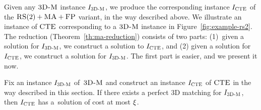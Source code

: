 
 \bigskip
 
 Given any $\textsc{3D-M}$ instance $I_{\mathrm{\textsc{3D-M}}}$, we produce the corresponding instance $I_{\mathrm{\textsc{CTE}}}$ of the $\textsc{RS}(2)+\textsc{MA}+\textsc{FP}$ variant, in the way described above.
 We illustrate an instance of $\textsc{CTE}$ corresponding to a $\textsc{3D-M}$ instance in Figure~\ref{fig:example-rs2}.
 The reduction (Theorem~\ref{th:ma-reduction}) consists of two parts: (1)~given a solution for $I_{\mathrm{\textsc{3D-M}}}$, we construct a solution to $I_{\mathrm{\textsc{CTE}}}$, and (2) given a solution for $I_{\mathrm{\textsc{CTE}}}$, we construct a solution for $I_{\mathrm{\textsc{3D-M}}}$.
 The first part is easier, and we present it now.
\begin{lemma}
  Fix an instance $I_{\mathrm{\textsc{3D-M}}}$ of~$\textsc{3D-M}$ and construct an instance $I_{\mathrm{\textsc{CTE}}}$ of $\textsc{CTE}$ in the way described in this section.
  If there exists a perfect 3D matching for $I_{\mathrm{\textsc{3D-M}}}$, then $I_{\mathrm{\textsc{CTE}}}$ has a~solution of cost at most $\xi$.
    \label{lem:ma-reduction-left}
\end{lemma}
